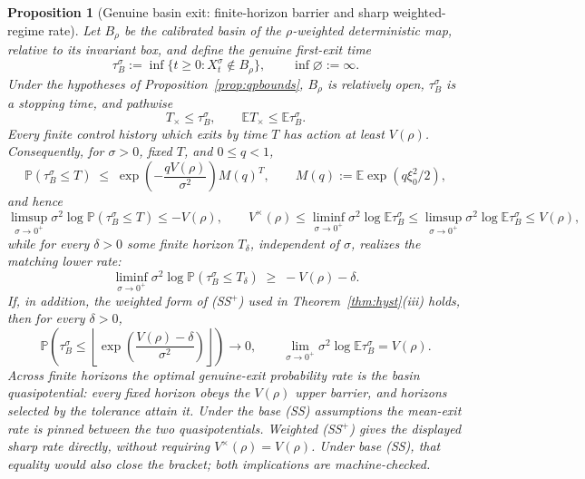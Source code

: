 \documentclass[11pt]{article}
\newtheorem{proposition}[theorem]{Proposition}
\theoremstyle{definition}
\theoremstyle{remark}
\numberwithin{equation}{section}
\begin{document}
\begin{proposition}[Genuine basin exit: finite-horizon barrier and sharp weighted-regime rate]\label{prop:basinexitprocess}
Let $B_\rho$ be the calibrated basin of the $\rho$-weighted deterministic map, relative to its invariant box, and define the genuine first-exit time
\[
\tau_B^\sigma := \inf\{t\ge 0:X_t^\sigma\notin B_\rho\},
\qquad \inf\varnothing:=\infty.
\]
Under the hypotheses of Proposition~\ref{prop:qpbounds}, $B_\rho$ is relatively open, $\tau_B^\sigma$ is a stopping time, and pathwise
\[
T_\times\le \tau_B^\sigma,
\qquad
\mathbb E T_\times\le \mathbb E\tau_B^\sigma.
\]
Every finite control history which exits by time $T$ has action at least $V(\rho)$. Consequently, for $\sigma>0$, fixed $T$, and $0\le q<1$,
\[
\mathbb P(\tau_B^\sigma\le T)
\;\le\;
\exp\!\left(-\frac{qV(\rho)}{\sigma^2}\right)M(q)^T,
\qquad
M(q):=\mathbb E\exp(q\xi_0^2/2),
\]
and hence
\[
\limsup_{\sigma\to0^+}\sigma^2
  \log\mathbb P(\tau_B^\sigma\le T)\le -V(\rho),
\qquad
V^\times(\rho)\le\liminf_{\sigma\to0^+}\sigma^2\log\mathbb E\tau_B^\sigma
\le\limsup_{\sigma\to0^+}\sigma^2\log\mathbb E\tau_B^\sigma\le V(\rho),
\]
while for every $\delta>0$ some finite horizon $T_\delta$, independent of $\sigma$, realizes the matching lower rate:
\[
\liminf_{\sigma\to0^+}\sigma^2\log\mathbb P(\tau_B^\sigma\le T_\delta)\;\ge\;-V(\rho)-\delta .
\]
If, in addition, the weighted form of (SS$^+$) used in Theorem~\ref{thm:hyst}(iii) holds, then for every $\delta>0$,
\[
\mathbb P\!\left(
  \tau_B^\sigma\le
  \left\lfloor
    \exp\!\left(\frac{V(\rho)-\delta}{\sigma^2}\right)
  \right\rfloor
\right)\longrightarrow 0,
\qquad
\lim_{\sigma\to0^+}\sigma^2\log\mathbb E\tau_B^\sigma=V(\rho).
\]
Across finite horizons the optimal genuine-exit probability rate is the basin quasipotential: every fixed horizon obeys the $V(\rho)$ upper barrier, and horizons selected by the tolerance attain it. Under the base (SS) assumptions the mean-exit rate is pinned between the two quasipotentials. Weighted (SS$^+$) gives the displayed sharp rate directly, without requiring $V^\times(\rho)=V(\rho)$. Under base (SS), that equality would also close the bracket; both implications are machine-checked.
\end{proposition}
\end{document}
